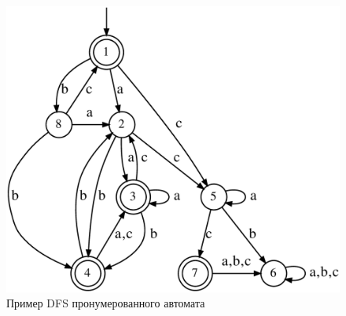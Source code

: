 \begin{figure}[ht]
  \centering
  \includegraphics[scale=0.12]{img/datamod/DFS-example.eps}
  \caption{Пример DFS пронумерованного автомата}
  \label{img:dfs-ex}
\end{figure}

